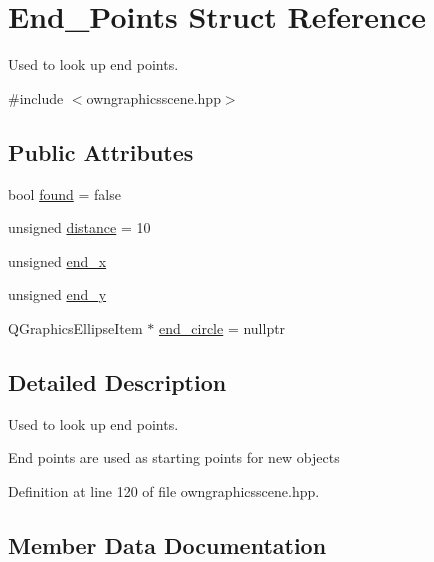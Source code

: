 \hypertarget{structEnd__Points}{}\section{End\+\_\+\+Points Struct Reference}
\label{structEnd__Points}


Used to look up end points.  




{\ttfamily \#include $<$owngraphicsscene.\+hpp$>$}

\subsection*{Public Attributes}
\begin{DoxyCompactItemize}
\item 
bool \mbox{\hyperlink{structEnd__Points_aff9dd173210b07bb087d70cf5ec9439f}{found}} = false
\item 
unsigned \mbox{\hyperlink{structEnd__Points_a08442d5de0da7d680a5a0fba7df6cf3b}{distance}} = 10
\item 
unsigned \mbox{\hyperlink{structEnd__Points_a2b33a99792ec437e7c2369ceaf435176}{end\+\_\+x}}
\item 
unsigned \mbox{\hyperlink{structEnd__Points_a04207ee9a97ee6d785b493305cd9e7e8}{end\+\_\+y}}
\item 
Q\+Graphics\+Ellipse\+Item $\ast$ \mbox{\hyperlink{structEnd__Points_abf301947140c1584823b50071c7b8ee6}{end\+\_\+circle}} = nullptr
\end{DoxyCompactItemize}


\subsection{Detailed Description}
Used to look up end points. 

End points are used as starting points for new objects 

Definition at line 120 of file owngraphicsscene.\+hpp.



\subsection{Member Data Documentation}
\mbox{\label{structEnd__Points_a08442d5de0da7d680a5a0fba7df6cf3b}} 
